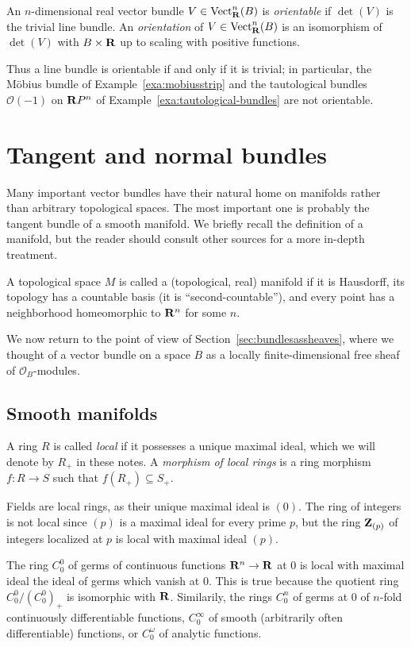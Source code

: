 \documentclass[a4paper,openany]{scrbook}
\DeclareMathOperator{\Vect}{Vect}
\begin{document}
\begin{defn}
An $n$-dimensional real vector bundle $V \in \Vect^n_\R(B)$ is \emph{orientable} if $\det(V)$ is the trivial line bundle. An \emph{orientation} of $V \in \Vect^n_\R(B)$ is an isomorphism of $\det(V)$ with $B \times \mathbf R$ up to scaling with positive functions.
\end{defn}

Thus a line bundle is orientable if and only if it is trivial; in particular, the Möbius bundle of Example~\ref{exa:mobiusstrip} and the tautological bundles $\mathcal O(-1)$ on $\mathbf R P^n$ of Example~\ref{exa:tautological-bundles} are not orientable.

\section{Tangent and normal bundles}

Many important vector bundles have their natural home on manifolds rather than arbitrary topological spaces. The most important one is probably the tangent bundle of a smooth manifold. We briefly recall the definition of a manifold, but the reader should consult other sources for a more in-depth treatment.

\begin{defn}
A topological space $M$ is called a (topological, real) manifold if it is Hausdorff, its topology has a countable basis (it is ``second-countable''), and every point has a neighborhood homeomorphic to $\mathbf R^n$ for some $n$.
\end{defn}

We now return to the point of view of Section~\ref{sec:bundlesassheaves}, where we thought of a vector bundle on a space $B$ as a locally finite-dimensional free sheaf of $\mathcal O_B$-modules.

\subsection{Smooth manifolds}

\begin{defn}
A ring $R$ is called \emph{local} if it possesses a unique maximal ideal, which we will denote by $R_+$ in these notes. A \emph{morphism of local rings} is a ring morphism $f\colon R \to S$ such that $f(R_+) \subseteq S_+$.
\end{defn}

\begin{example}
Fields are local rings, as their unique maximal ideal is $(0)$. The ring of integers is not local since $(p)$ is a maximal ideal for every prime $p$, but the ring $\mathbf Z_{(p)}$ of integers localized at $p$ is local with maximal ideal $(p)$. 

The ring $C^0_0$ of germs of continuous functions $\mathbf R^n \to \mathbf R$ at $0$ is local with maximal ideal the ideal of germs which vanish at $0$. This is true because the quotient ring $C^0_0/(C^0_0)_+$ is isomorphic with $\mathbf R$. Similarily, the rings $C^n_0$ of germs at $0$ of $n$-fold continuously differentiable functions, $C^\infty_0$ of smooth (arbitrarily often differentiable) functions, or $C^\omega_0$ of analytic functions.
\end{example}
\end{document}
